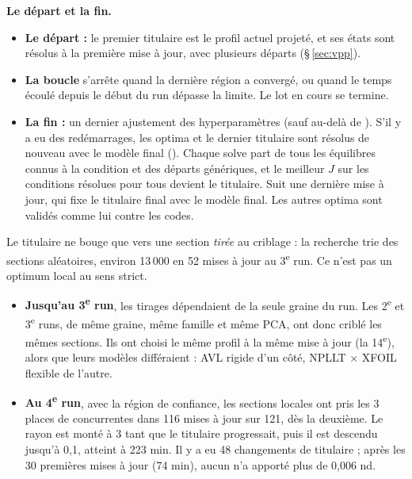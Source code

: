 \documentclass[10pt,a4paper]{article}
\begin{document}
\textbf{Le départ et la fin.}
\begin{itemize}
  \item \textbf{Le départ :} le premier titulaire est le profil actuel projeté, et ses états sont résolus à la
        première mise à jour, avec plusieurs départs (§\,\ref{sec:vpp}).
  \item \textbf{La boucle} s'arrête quand la dernière région a convergé, ou quand le temps écoulé depuis le
        début du run dépasse la limite. Le lot en cours se termine.
  \item \textbf{La fin :} un dernier ajustement des hyperparamètres (sauf au-delà de ).
        S'il y a eu des redémarrages, les optima et le dernier titulaire sont résolus de nouveau avec le modèle
        final (). Chaque solve part de tous les équilibres connus à la condition et des départs
        génériques, et le meilleur $J$ sur les conditions résolues pour tous devient le titulaire. Suit une
        dernière mise à jour, qui fixe le titulaire final avec le modèle final. Les autres optima sont validés
        comme lui contre les codes.
\end{itemize}

\begin{subtilite}
Le titulaire ne bouge que vers une section \emph{tirée} au criblage : la recherche trie des sections
aléatoires, environ 13\,000 en 52 mises à jour au 3\textsuperscript{e} run. Ce n'est pas un optimum local au
sens strict.
\begin{itemize}
  \item \textbf{Jusqu'au 3\textsuperscript{e} run}, les tirages dépendaient de la seule graine du run. Les
        2\textsuperscript{e} et 3\textsuperscript{e} runs, de même graine, même famille et même PCA, ont donc
        criblé les mêmes sections. Ils ont choisi le même profil à la même mise à jour (la
        14\textsuperscript{e}), alors que leurs modèles différaient : AVL rigide d'un côté, NPLLT × XFOIL
        flexible de l'autre.
  \item \textbf{Au 4\textsuperscript{e} run}, avec la région de confiance, les sections locales ont pris les 3
        places de concurrentes dans 116 mises à jour sur 121, dès la deuxième. Le
        rayon est monté à 3 tant que le titulaire progressait, puis il est descendu jusqu'à 0,1, atteint à
        223 min. Il y a eu 48 changements de titulaire ; après les 30 premières mises à jour (74 min), aucun
        n'a apporté plus de 0,006 nd.
\end{itemize}
\end{subtilite}
\end{document}
